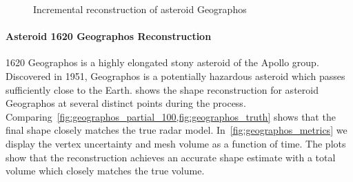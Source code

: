 \documentclass[smallextended]{svjour3}       %
\begin{document}
\begin{figure}[htbp]
    \centering


    \caption[Asteroid Geographos incremental reconstruction]{Incremental reconstruction of asteroid Geographos~\label{fig:geographos_reconstruction}}
\end{figure}

\paragraph{Asteroid \num{1620} Geographos Reconstruction} 
\num{1620} Geographos is a highly elongated stony asteroid of the Apollo group.
Discovered in \num{1951}, Geographos is a potentially hazardous asteroid which passes sufficiently close to the Earth.
 shows the shape reconstruction for asteroid Geographos at several distinct points during the process.
Comparing~\cref{fig:geographos_partial_100,fig:geographos_truth} shows that the final shape closely matches the true radar model.
In~\cref{fig:geographos_metrics} we display the vertex uncertainty and mesh volume as a function of time.
The plots show that the reconstruction achieves an accurate shape estimate with a total volume which closely matches the true volume.
\end{document}
